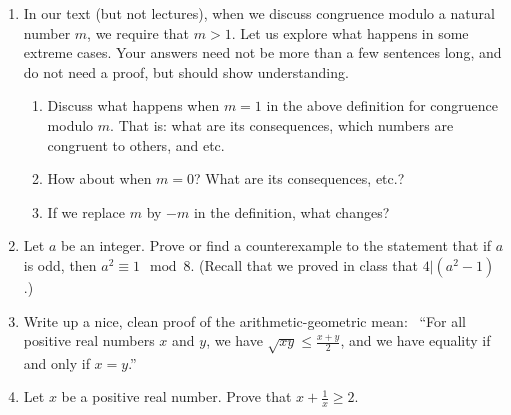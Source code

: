 \documentclass[12pt]{article}
\begin{document}
\begin{enumerate}  %


\item In our text (but not lectures), when we discuss congruence modulo a natural number $m$, we require that $m>1$.
  Let us explore what happens in some extreme cases.
  Your answers need not be more than a few sentences long, and do not need a proof, but should show understanding.
  
  \begin{enumerate}
  \item Discuss what happens when $m=1$ in the above definition for congruence modulo $m$.
        That is: what are its consequences, which numbers are congruent to others, and etc.

  \item How about when $m=0$?   What are its consequences, etc.?


  \item If we replace $m$ by $-m$ in the definition, what changes?

  \end{enumerate}    

\item Let $a$ be an integer.   Prove or find a counterexample to the statement that if $a$ is odd, then $a^2 \equiv 1 \mod 8$.
      (Recall that we proved in class that $4|(a^2-1)$.)

\item Write up a nice, clean proof of the arithmetic-geometric mean: \ 
  ``For all positive real numbers $x$ and $y$,  we have $\sqrt{xy}\leq \frac{x+y}{2}$, and we have equality if and only if $x=y$.''

\item Let $x$ be a positive real number.
  Prove that $x+\frac{1}{x} \geq 2$.


\end{enumerate}
\end{document}

